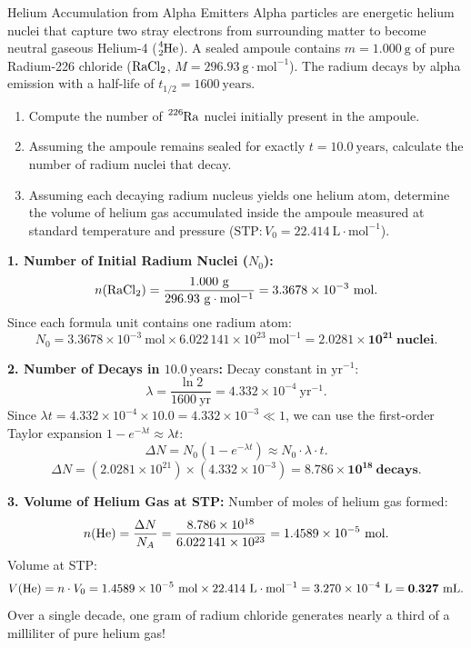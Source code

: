 \begin{exercise}{Helium Accumulation from Alpha Emitters}
Alpha particles are energetic helium nuclei that capture two stray electrons from surrounding matter to become neutral gaseous Helium-4 ($\ce{^{4}_{2}He}$).
A sealed ampoule contains $m = 1.000\ \mathrm{g}$ of pure Radium-226 chloride ($\ce{RaCl2}$, $M = 296.93\ \mathrm{g\cdot mol^{-1}}$). The radium decays by alpha emission with a half-life of $t_{1/2} = 1600\ \mathrm{years}$.
\begin{enumerate}[leftmargin=1.5em,itemsep=2pt]
  \item Compute the number of $\ce{^{226}Ra}$ nuclei initially present in the ampoule.
  \item Assuming the ampoule remains sealed for exactly $t = 10.0\ \mathrm{years}$, calculate the number of radium nuclei that decay.
  \item Assuming each decaying radium nucleus yields one helium atom, determine the volume of helium gas accumulated inside the ampoule measured at standard temperature and pressure ($\mathrm{STP}: V_0 = 22.414\ \mathrm{L\cdot mol^{-1}}$).
\end{enumerate}
\end{exercise}

\begin{tabletworkspace}[5.0cm]
\end{tabletworkspace}

\begin{solution}
\textbf{1. Number of Initial Radium Nuclei ($N_0$):}
\[
n(\ce{RaCl2}) = \frac{1.000\ \mathrm{g}}{296.93\ \mathrm{g\cdot mol^{-1}}} = 3.3678 \times 10^{-3}\ \mathrm{mol}.
\]
Since each formula unit contains one radium atom:
\[
N_0 = 3.3678 \times 10^{-3}\ \mathrm{mol} \times 6.022\,141 \times 10^{23}\ \mathrm{mol^{-1}} = \mathbf{2.0281 \times 10^{21}\ \text{nuclei}}.
\]

\textbf{2. Number of Decays in $10.0\ \mathrm{years}$:}
Decay constant in $\mathrm{yr^{-1}}$:
\[
\lambda = \frac{\ln 2}{1600\ \mathrm{yr}} = 4.332 \times 10^{-4}\ \mathrm{yr^{-1}}.
\]
Since $\lambda t = 4.332 \times 10^{-4} \times 10.0 = 4.332 \times 10^{-3} \ll 1$, we can use the first-order Taylor expansion $1 - e^{-\lambda t} \approx \lambda t$:
\[
\Delta N = N_0(1 - e^{-\lambda t}) \approx N_0 \cdot \lambda \cdot t.
\]
\[
\Delta N = (2.0281 \times 10^{21}) \times (4.332 \times 10^{-3}) = \mathbf{8.786 \times 10^{18}\ \text{decays}}.
\]

\textbf{3. Volume of Helium Gas at STP:}
Number of moles of helium gas formed:
\[
n(\ce{He}) = \frac{\Delta N}{N_A} = \frac{8.786 \times 10^{18}}{6.022\,141 \times 10^{23}} = 1.4589 \times 10^{-5}\ \mathrm{mol}.
\]
Volume at STP:
\[
V(\ce{He}) = n \cdot V_0 = 1.4589 \times 10^{-5}\ \mathrm{mol} \times 22.414\ \mathrm{L\cdot mol^{-1}} = 3.270 \times 10^{-4}\ \mathrm{L} = \mathbf{0.327\ \mathrm{mL}}.
\]
Over a single decade, one gram of radium chloride generates nearly a third of a milliliter of pure helium gas!
\end{solution}

